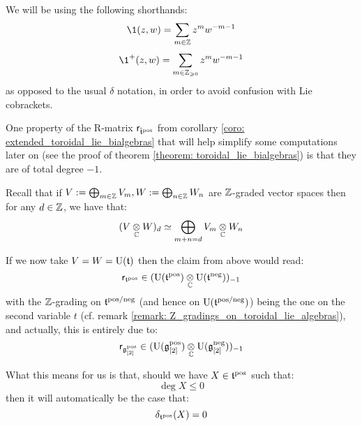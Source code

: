         \begin{convention} \label{conv: formal_dirac_distributions}
            We will be using the following shorthands:
                $$\1(z, w) = \sum_{m \in \Z} z^m w^{-m - 1}$$
                $$\1^+(z, w) = \sum_{m \in \Z_{\geq 0}} z^m w^{-m - 1}$$
            as opposed to the usual $\delta$ notation, in order to avoid confusion with Lie cobrackets.
        \end{convention}

        \begin{remark} \label{remark: total_degrees_of_classical_yangian_R_matrices}
            One property of the R-matrix $\mathsf{r}_{\hat{\mathfrak{t}}^{\mathrm{pos}}}$ from corollary \ref{coro: extended_toroidal_lie_bialgebras} that will help simplify some computations later on (see the proof of theorem \ref{theorem: toroidal_lie_bialgebras}) is that they are of total degree $-1$. 

            Recall that if $V := \bigoplus_{m \in \mathbb{Z}} V_m, W := \bigoplus_{n \in \mathbb{Z}} W_n$ are $\mathbb{Z}$-graded vector spaces then for any $d \in \mathbb{Z}$, we have that:
                $$(V \tensor_{\bbC} W)_d \cong \bigoplus_{m + n = d} V_m \tensor_{\bbC} W_n$$
                
            If we now take $V = W = \mathrm{U}(\mathfrak{t})$ then the claim from above would read:
                $$\sfr_{\toroidal^{\positive}} \in ( \rmU(\toroidal^{\positive}) \tensor_{\bbC} \rmU(\toroidal^{\negative}) )_{-1}$$
            with the $\mathbb{Z}$-grading on $\mathfrak{t}^{\mathrm{pos}/\mathrm{neg}}$ (and hence on $\mathrm{U}(\mathfrak{t}^{\mathrm{pos}/\mathrm{neg}})$) being the one on the second variable $t$ (cf. remark \ref{remark: Z_gradings_on_toroidal_lie_algebras}), and actually, this is entirely due to:
                $$\sfr_{\g_{[2]}^{\positive}} \in ( \rmU(\g_{[2]}^{\positive}) \tensor_{\bbC} \rmU(\g_{[2]}^{\negative}) )_{-1}$$

            What this means for us is that, should we have $X \in \mathfrak{t}^{\mathrm{pos}}$ such that:
                $$\deg X \leq 0$$
            then it will automatically be the case that:
                $$\delta_{\mathfrak{t}^{\mathrm{pos}}}(X) = 0$$
        \end{remark}
        
